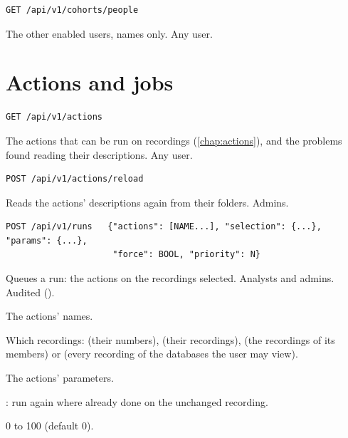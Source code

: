 \begin{lstlisting}[style=signature]
GET /api/v1/cohorts/people
\end{lstlisting}
The other enabled users, names only. Any user.

\section{Actions and jobs}
\label{sec:http-api-work}

\begin{lstlisting}[style=signature]
GET /api/v1/actions
\end{lstlisting}
The actions that can be run on recordings (\cref{chap:actions}), and the problems found reading
their descriptions. Any user.

\begin{lstlisting}[style=signature]
POST /api/v1/actions/reload
\end{lstlisting}
Reads the actions' descriptions again from their folders. Admins.

\begin{lstlisting}[style=signature]
POST /api/v1/runs   {"actions": [NAME...], "selection": {...}, "params": {...},
                     "force": BOOL, "priority": N}
\end{lstlisting}
Queues a run: the actions on the recordings selected. Analysts and admins. Audited
().
\begin{params}
\item[actions] The actions' names.
\item[selection] Which recordings:  (their numbers),
   (their recordings),  (the recordings of
  its members) or  (every recording of the databases the user may view).
\item[params] The actions' parameters.
\item[force] : run again where already done on the unchanged recording.
\item[priority] 0 to 100 (default 0).
\end{params}

